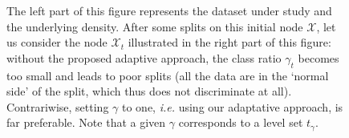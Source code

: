 \begin{figure}
\caption{ The left part of this figure represents
the dataset under study and the underlying density.
After some splits on this initial node $\mathcal{X}$,
let us consider the node $\mathcal{X}_t$ illustrated in the right part of this figure:
without the proposed adaptive approach, the class ratio
$\gamma_t$ becomes too small
and leads to poor splits %
(all the data are in the `normal side' of the split, which thus does not discriminate at all).
Contrariwise, setting $\gamma$ to one, \textit{i.e.} using our adaptative approach,
is far preferable.
Note that a given $\gamma$ corresponds to a level set $t_{\gamma}$.}
\label{ocrf:fig:split_alpha}

\end{figure}



